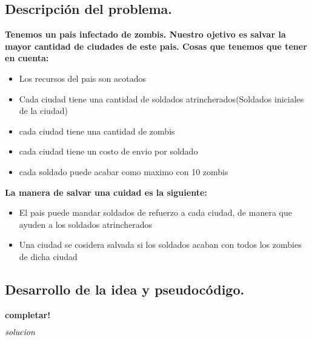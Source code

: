 \subsection{Descripción del problema.}

\vspace*{0.3cm}

\textbf{
Tenemos un pais infectado de zombis. Nuestro ojetivo es salvar la mayor cantidad de ciudades de este pais.
Cosas que tenemos que tener en cuenta:
}
\begin{itemize}
   \item Los recursos del pais son acotados 
   \item Cada ciudad tiene una cantidad de soldados atrincherados(Soldados iniciales de la ciudad)  
   \item cada ciudad tiene una cantidad de zombis  
   \item cada ciudad tiene un costo de envio por soldado
   \item cada soldado puede acabar como maximo con 10 zombis 
\end{itemize}

\textbf{
La manera de salvar una cuidad es la siguiente:
}         
\begin{itemize}
	\item El pais puede mandar soldados de refuerzo a cada ciudad, de manera que ayuden a los soldados atrincherados
	\item Una ciudad se cosidera salvada si los soldados acaban con todos los zombies de dicha ciudad
\end{itemize}





\newpage
\subsection{Desarrollo de la idea y pseudocódigo.}

\vspace*{0.3cm}

\textbf{completar!}

\begin{codebox}
\li \Return $\id{solucion}$
\end{codebox}



